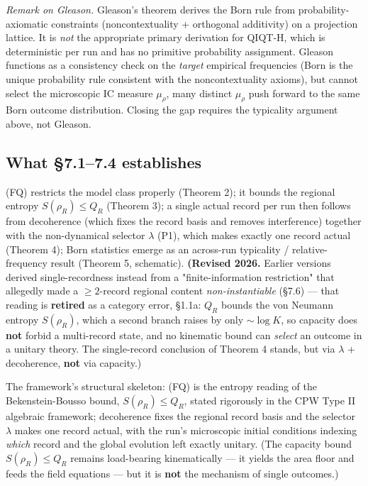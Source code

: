 \documentclass[11pt,a4paper]{article}
\begin{document}
\emph{Remark on Gleason.} Gleason's theorem derives the Born rule from probability-axiomatic constraints (noncontextuality + orthogonal additivity) on a projection lattice. It is \emph{not} the appropriate primary derivation for QIQT-H, which is deterministic per run and has no primitive probability assignment. Gleason functions as a consistency check on the \emph{target} empirical frequencies (Born is the unique probability rule consistent with the noncontextuality axioms), but cannot select the microscopic IC measure $\mu_\rho$, many distinct $\mu_\rho$ push forward to the same Born outcome distribution. Closing the gap requires the typicality argument above, not Gleason.

\subsection{What §7.1–7.4 establishes}

(FQ) restricts the model class properly (Theorem 2); it bounds the regional entropy $S(\rho_R) \le Q_R$ (Theorem 3); a single actual record per run then follows from decoherence (which fixes the record basis and removes interference) together with the non-dynamical selector $\lambda$ (P1), which makes exactly one record actual (Theorem 4); Born statistics emerge as an across-run typicality / relative-frequency result (Theorem 5, schematic). \textbf{(Revised 2026.} Earlier versions derived single-recordness instead from a "finite-information restriction" that allegedly made a $\ge 2$-record regional content \emph{non-instantiable} (§7.6) — that reading is \textbf{retired} as a category error, §1.1a: $Q_R$ bounds the von Neumann entropy $S(\rho_R)$, which a second branch raises by only $\sim\!\log K$, so capacity does \textbf{not} forbid a multi-record state, and no kinematic bound can \emph{select} an outcome in a unitary theory. The single-record conclusion of Theorem 4 stands, but via $\lambda$ + decoherence, \textbf{not} via capacity.)

The framework's structural skeleton: (FQ) is the entropy reading of the Bekenstein-Bousso bound, $S(\rho_R) \le Q_R$, stated rigorously in the CPW Type II algebraic framework; decoherence fixes the regional record basis and the selector $\lambda$ makes one record actual, with the run's microscopic initial conditions indexing \emph{which} record and the global evolution left exactly unitary. (The capacity bound $S(\rho_R)\le Q_R$ remains load-bearing kinematically — it yields the area floor and feeds the field equations — but it is \textbf{not} the mechanism of single outcomes.)
\end{document}
